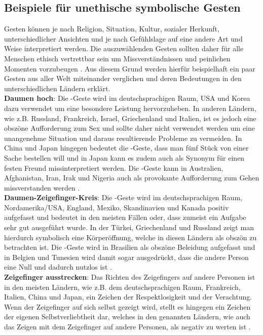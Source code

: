 \subsection{Beispiele für unethische symbolische Gesten}
Gesten können je nach Religion, Situation, Kultur, sozialer Herkunft, unterschiedlicher Ansichten und je nach Gefühlslage auf eine andere Art und Weise interpretiert werden. Die auszuwählenden Gesten sollten daher für alle Menschen ethisch vertrettbar sein um Missverständnissen und peinlichen Momenten vorzubeugen \cite{gesten_liste_2020}. Aus diesem Grund werden hierfür beispielhaft ein paar Gesten aus aller Welt miteinander verglichen und deren Bedeutungen in den unterschiedlichen Ländern erklärt.\\

\textbf{Daumen hoch}: Die -Geste wird im deutschsprachigen Raum, USA und Korea dazu verwendet um eine besondere Leistung hervorzuheben. In anderen Ländern, wie z.B. Russland, Frankreich, Israel, Griechenland und Italien, ist es jedoch eine obszöne Aufforderung zum Sex und sollte daher nicht verwendet werden um eine unangenehme Situation und daraus resultierende Probleme zu vermeiden. In China und Japan hingegen bedeutet die -Geste, dass man fünf Stück von einer Sache bestellen will und in Japan kann es zudem auch als Synonym für einen festen Freund missinterpretiert werden. Die -Geste kann in Australien, Afghanistan, Iran, Irak und Nigeria auch als provokante Aufforderung zum Gehen missverstanden werden \cite{handzeichen_gesten_2018}.\\

\textbf{Daumen-Zeigefinger-Kreis}: Die -Geste wird im deutschsprachigen Raum, Nordamerika/USA, England, Mexiko, Skandinavien und Kanada positiv aufgefasst und bedeutet in den meisten Fällen  oder, dass zumeist ein Aufgabe sehr gut ausgeführt wurde. In der Türkei, Griechenland und Russland zeigt man hierdurch symbolisch eine Körperöffnung, welche in diesen Ländern als obszön zu betrachten ist. Die -Geste wird in Brasilien als obszöne Beleidung aufgefasst und in Belgien und Tunesien wird damit sogar ausgedrückt, dass die andere Person eine Null und dadurch nutzlos ist \cite{handzeichen_gesten_2018}.\\

\textbf{Zeigefinger ausstrecken}: Das Richten des Zeigefingers auf andere Personen ist in den meisten Ländern, wie z.B. dem deutschsprachigen Raum, Frankreich, Italien, China und Japan, ein Zeichen der Respektlosigkeit und der Verachtung. Wenn der Zeigefinger auf sich selbst gezeigt wird, stellt es hingegen ein Zeichen der eigenen Selbstverliebtheit dar, welches in den genannten Ländern, wie auch das Zeigen mit dem Zeigefinger auf andere Personen, als negativ zu werten ist \cite{gesten_vergleich_nodate}.\\

